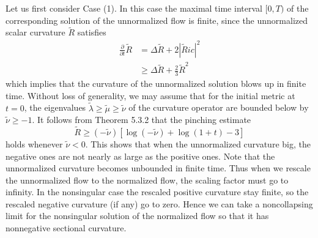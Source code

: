 \smallskip
Let us first consider Case (1). In this case the maximal time
interval $[0,T)$ of the corresponding solution of the unnormalized
flow is finite, since the unnormalized scalar curvature
$\tilde{R}$ satisfies
\begin{displaymath}
\begin{split}
\frac{\partial}{\partial t}\tilde{R}
&  =\Delta\tilde{R}+2|\tilde{R}ic|^2\\
&  \geq\Delta\tilde{R}+\frac{2}{3}\tilde{R}^2
\end{split}
\end{displaymath}
which implies that the curvature of the unnormalized solution
blows up in finite time. Without loss of generality, we may assume
that for the initial metric at $t=0$, the eigenvalues
$\tilde{\lambda}\geq\tilde{\mu}\geq\tilde{\nu}$ of the curvature
operator are bounded below by $\tilde{\nu}\geq-1$. It follows from
Theorem 5.3.2 that the pinching estimate
$$
\tilde{R}\geq(-\tilde{\nu})[\log(-\tilde{\nu})+\log(1+t)-3]
$$
holds whenever $\tilde{\nu}<0$. This shows that when the
unnormalized curvature big, the negative ones are not nearly as
large as the positive ones. Note that the unnormalized curvature
becomes unbounded in finite time. Thus when we rescale the
unnormalized flow to the normalized flow, the scaling factor must
go to infinity. In the nonsingular case the rescaled positive
curvature stay finite, so the rescaled negative curvature (if any)
go to zero. Hence we can take a noncollapsing limit for the
nonsingular solution of the normalized flow so that it has
nonnegative sectional curvature.

